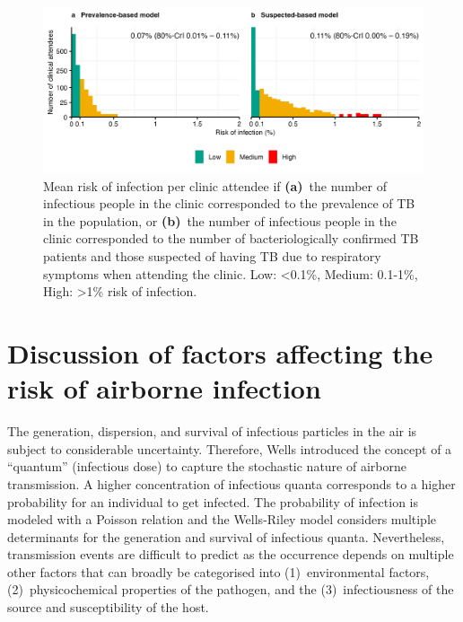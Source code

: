 \documentclass[fleqn,11pt]{wlscirep_supp}
\begin{document}
\begin{figure}[!htpb]
    \centering
    \includegraphics{results/modeling/mean-roi-assumptions.png}
    \caption[Mean risk of infection per clinic attendee when varying assumptions about the number of infectious people in the clinic]{Mean risk of infection per clinic attendee if \textbf{(a)}~the number of infectious people in the clinic corresponded to the prevalence of TB in the population, or \textbf{(b)}~the number of infectious people in the clinic corresponded to the number of bacteriologically confirmed TB patients and those suspected of having TB due to respiratory symptoms when attending the clinic. Low: <0.1\%, Medium: 0.1-1\%, High: >1\% risk of infection.}
    \label{fig:assumptions-results}
\end{figure}

\clearpage

\section{Discussion of factors affecting the risk of airborne infection}\label{sec:depth-discussion}


The generation, dispersion, and survival of infectious particles in the air is subject to considerable uncertainty. Therefore, Wells\cite{Wells1955} introduced the concept of a ``quantum'' (infectious dose) to capture the stochastic nature of airborne transmission. A higher concentration of infectious quanta corresponds to a higher probability for an individual to get infected. The probability of infection is modeled with a Poisson relation and the Wells-Riley model considers multiple determinants for the generation and survival of infectious quanta. Nevertheless, transmission events are difficult to predict as the occurrence depends on multiple other factors that can broadly be categorised into (1)~environmental factors, (2)~physicochemical properties of the pathogen, and the (3)~infectiousness of the source and susceptibility of the host. 
\end{document}
